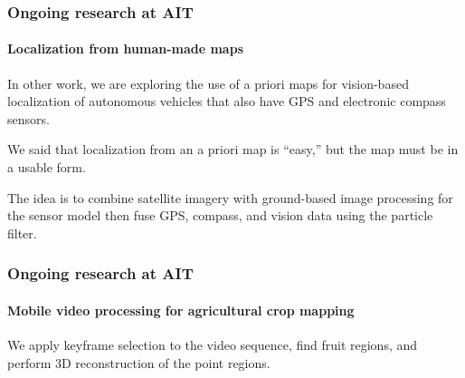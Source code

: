 \documentclass[aspectratio=169]{beamer}
\newcommand{\myfig}[3]{\centerline{\texttt{[image: \#2]}}
    \centerline{\scriptsize \begin{minipage}{#1} \centering #3 \end{minipage}}}
\begin{document}
\begin{frame}
\frametitle{Ongoing research at AIT}
\framesubtitle{Localization from human-made maps}

In other work, we are exploring the use of a priori maps for
vision-based localization of autonomous vehicles that also have
GPS and electronic compass sensors.

\medskip

We said that localization from an a priori map is ``easy,'' but the
map must be in a usable form.

\medskip

The idea is to combine satellite imagery with ground-based image processing
for the sensor model then fuse GPS, compass, and vision data using
the particle filter.

\end{frame}







\begin{frame}
\frametitle{Ongoing research at AIT}
\framesubtitle{Mobile video processing for agricultural crop mapping}

We apply keyframe selection to the video sequence, find fruit regions,
and perform 3D reconstruction of the point regions.


\end{frame}
\end{document}
